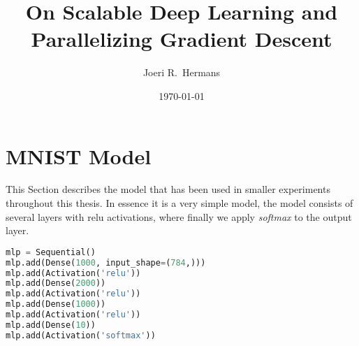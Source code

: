 \documentclass[10pt, a4paper, oneside]{book}
\title{On Scalable Deep Learning and Parallelizing Gradient Descent}  %
\author{Joeri R.~Hermans}                                             %
\date{\today}                                                         %
\theoremstyle{definition}
\begin{document}


\frontmatter
\let\cleardoublepage\clearpage

%


\tableofcontents
\printnomenclature[3cm]

\mainmatter







\clearpage
\printbibliography

\appendix
\appendixpage

\section{MNIST Model}
\label{appendix:mnist_model}

This Section describes the model that has been used in smaller experiments throughout this thesis. In essence it is a very simple model, the model consists of several layers with relu activations, where finally we apply \emph{softmax} to the output layer.

\begin{lstlisting}[language=Python]
mlp = Sequential()
mlp.add(Dense(1000, input_shape=(784,)))
mlp.add(Activation('relu'))
mlp.add(Dense(2000))
mlp.add(Activation('relu'))
mlp.add(Dense(1000))
mlp.add(Activation('relu'))
mlp.add(Dense(10))
mlp.add(Activation('softmax'))
\end{lstlisting}
\end{document}
